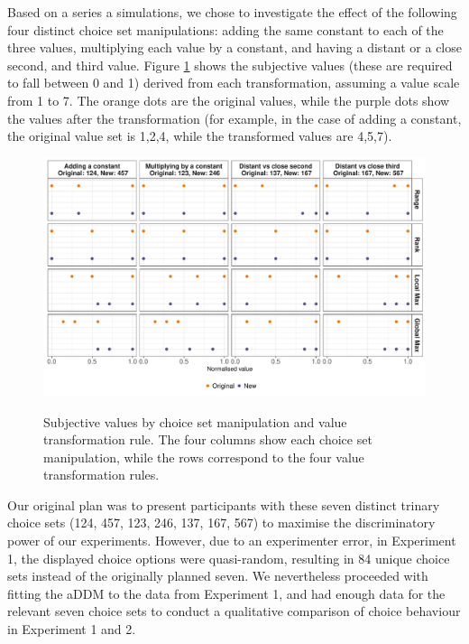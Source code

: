 \documentclass[11pt,a4paper]{article}
\begin{document}
Based on a series a simulations, we chose to investigate the effect of the following four distinct choice set manipulations: adding the same constant to each of the three values, multiplying each value by a constant, and having a distant or a close second, and third value. Figure \ref{fig:choicesetmanip} shows the subjective values (these are required to fall between 0 and 1) derived from each transformation, assuming a value scale from 1 to 7. The orange dots are the original values, while the purple dots show the values after the transformation (for example, in the case of adding a constant, the original value set is 1,2,4, while the transformed values are 4,5,7).

\begin{figure}
\captionsetup{justification=centering}
\centering
\caption{Subjective values by choice set manipulation and value transformation rule. The four columns show each choice set manipulation, while the rows correspond to the four value transformation rules.}
\includegraphics[width=1\textwidth]{explain.pdf}
\label{fig:choicesetmanip}
\end{figure}

Our original plan was to present participants with these seven distinct trinary choice sets (124, 457, 123, 246, 137, 167, 567) to maximise the discriminatory power of our experiments. However, due to an experimenter error, in Experiment 1, the displayed choice options were quasi-random, resulting in 84 unique choice sets instead of the originally planned seven. We nevertheless proceeded with fitting the aDDM to the data from Experiment 1, and had enough data for the relevant seven choice sets to conduct a qualitative comparison of choice behaviour in Experiment 1 and 2.
\end{document}
